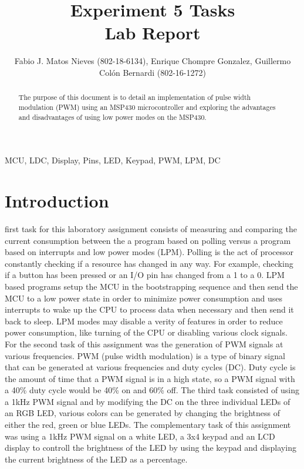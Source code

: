 \documentclass[journal]{IEEEtran}
\begin{document}
\title{Experiment 5 Tasks\\ Lab Report} \author{Fabio J. Matos
  Nieves (802-18-6134), Enrique Chompre Gonzalez, Guillermo Colón Bernardi (802-16-1272)}
\maketitle
\begin{abstract}
  The purpose of this document is to detail an implementation of pulse width modulation (PWM) using an MSP430 microcontroller and exploring the advantages and disadvantages of using low power modes on the MSP430.
\end{abstract}
\begin{IEEEkeywords}
  MCU, LDC, Display, Pins, LED, Keypad, PWM, LPM, DC
\end{IEEEkeywords}
\IEEEpeerreviewmaketitle
\section{Introduction}
 first task for this laboratory assignment consists of measuring and comparing the current consumption between the a program based on polling versus a program based on interrupts and low power modes (LPM). Polling is the act of processor constantly checking if a resource has changed in any way. For example, checking if a button has been pressed or an I/O pin has changed from a 1 to a 0. LPM based programs setup the MCU in the bootstrapping sequence and then send the MCU to a low power state in order to minimize power consumption and uses interrupts to wake up the CPU to process data when necessary and then send it back to sleep. LPM modes may disable a verity of features in order to reduce power consumption, like turning of the CPU or disabling various clock signals. For the second task of this assignment was the generation of PWM signals at various frequencies. PWM (pulse width modulation) is a type of binary signal that can be generated at various frequencies and duty cycles (DC). Duty cycle is the amount of time that a PWM signal is in a high state, so a PWM signal with a 40\% duty cycle would be 40\% on and 60\% off. The third task consisted of using a 1\si{kHz} PWM signal and by modifying the DC on the three individual LEDs of an RGB LED, various colors can be generated by changing the brightness of either the red, green or blue LEDs. The complementary task of this assignment was using a 1\si{kHz} PWM signal on a white LED, a 3x4 keypad and an LCD display to controll the brightness of the LED by using the keypad and displaying the current brightness of the LED as a percentage.\\
\end{document}
